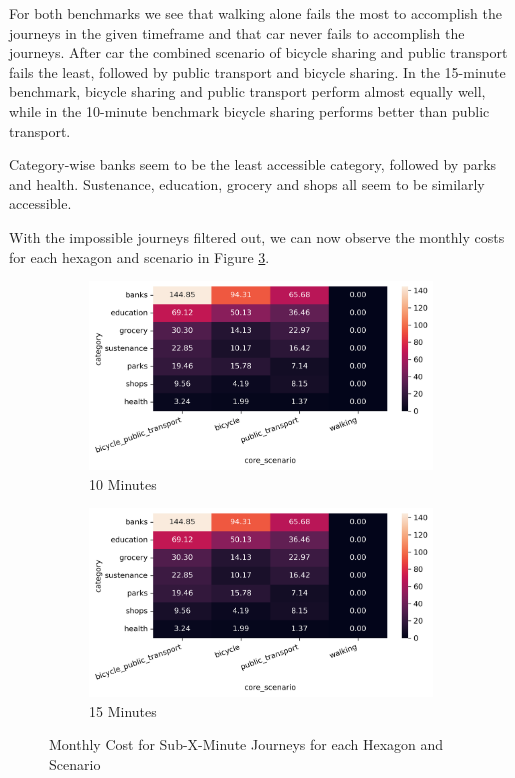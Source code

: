 For both benchmarks we see that walking alone fails the most to accomplish the journeys in the given timeframe and that car never fails to accomplish the journeys.
After car the combined scenario of bicycle sharing and public transport fails the least, followed by public transport and bicycle sharing.
In the 15-minute benchmark, bicycle sharing and public transport perform almost equally well, while in the 10-minute benchmark bicycle sharing performs better than public transport.

Category-wise banks seem to be the least accessible category, followed by parks and health.
Sustenance, education, grocery and shops all seem to be similarly accessible.

With the impossible journeys filtered out, we can now observe the monthly costs for each hexagon and scenario in Figure \ref{fig:costs_sub_x}.

\begin{figure}
  \centering
  \begin{subfigure}[b]{0.45\textwidth}
    \centering
    \includegraphics[width=\textwidth]{Figures/results/monthly_costs/cost_sub_10.png}
    \caption{10 Minutes}
    \label{fig:costs_sub_10}
  \end{subfigure}
  \hfill
  \begin{subfigure}[b]{0.45\textwidth}
    \centering
    \includegraphics[width=\textwidth]{Figures/results/monthly_costs/cost_sub_10.png}
    \caption{15 Minutes}
    \label{fig:costs_sub_15}
  \end{subfigure}
  \caption{Monthly Cost for Sub-X-Minute Journeys for each Hexagon and Scenario}
  \label{fig:costs_sub_x}
\end{figure}

